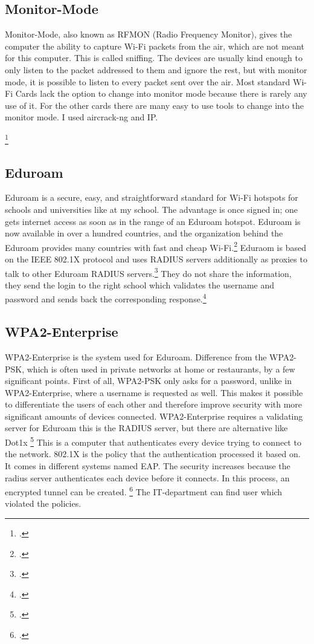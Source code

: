 \documentclass[11pt]{article}
\begin{document}
\subsection{Monitor-Mode}
Monitor-Mode, also known as RFMON (Radio Frequency Monitor), gives the computer the ability to capture Wi-Fi packets from the air, which are not meant for this computer. This is called sniffing. The devices are usually kind enough to only listen to the packet addressed to them and ignore the rest, but with monitor mode, it is possible to listen to every packet sent over the air.
Most standard Wi-Fi Cards lack the option to change into monitor mode because there is rarely any use of it. For the other cards there are many easy to use tools to change into the monitor mode. I used aircrack-ng and IP.

\footcite{monitor}
\subsection{Eduroam}
Eduroam is a secure, easy, and straightforward standard for Wi-Fi hotspots for schools and universities like at my school. The advantage is once signed in; one gets internet access as soon as in the range of an Eduroam hotspot. Eduroam is now available in over a hundred countries, and the organization behind the Eduroam provides many countries with fast and cheap Wi-Fi.\footcite{eduroam} Eduraom is based on the IEEE 802.1X protocol and uses RADIUS servers additionally as proxies to talk to other Eduroam RADIUS servers.\footcite[RADIUS Server]{WPA2} They do not share the information, they send the login to the right school which validates the username and password and sends back the corresponding response.\footcite{eduroam}

\subsection{WPA2-Enterprise}
WPA2-Enterprise is the system used for Eduroam. Difference from the WPA2-PSK, which is often used in private networks at home or restaurants, by a few significant points. First of all, WPA2-PSK only asks for a password, unlike in WPA2-Enterprise, where a username is requested as well. This makes it possible to differentiate the users of each other and therefore improve security with more significant amounts of devices connected. WPA2-Enterprise requires a validating server for Eduroam this is the RADIUS server, but there are alternative like Dot1x \footcite{radius}
This is a computer that authenticates every device trying to connect to the network. 802.1X is the policy that the authentication processed it based on. It comes in different systems named EAP. The security increases because the radius server authenticates each device before it connects. In this process, an encrypted tunnel can be created.
\footcite{WPA2}
The IT-department can find user which violated the policies. 
\end{document}
